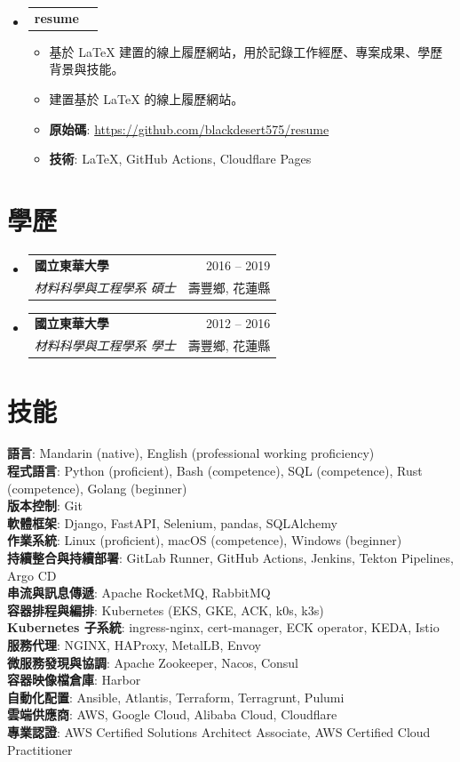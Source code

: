 \documentclass[letterpaper,11pt]{article}
\makeatletter
\newcommand{\resumeItem}[1]{
  \item\small{
    {#1 \vspace{-1pt}}
  }
}
\newcommand{\resumeSubheading}[4]{
  \vspace{-1pt}\item
    \begin{tabular*}{\textwidth}[t]{l@{\extracolsep{\fill}}r}
      \textbf{#1} & {\color{dark-grey}\small #2}\vspace{1pt}\\
      \textit{#3} & {\color{dark-grey} \small #4}\\
    \end{tabular*}\vspace{-4pt}
}
\newcommand{\resumeProjectHeading}[2]{
    \item
    \begin{tabular*}{\textwidth}{l@{\extracolsep{\fill}}r}
      #1 & {\color{dark-grey} #2} \\
    \end{tabular*}\vspace{-4pt}
}
\newcommand{\resumeSubHeadingListStart}{\begin{itemize}[leftmargin=0in, label={}]}
\newcommand{\resumeSubHeadingListEnd}{\end{itemize}}
\newcommand{\resumeItemListStart}{\begin{itemize}}
\newcommand{\resumeItemListEnd}{\end{itemize}\vspace{0pt}}
\makeatother
\begin{document}
\resumeSubHeadingListStart
\resumeProjectHeading
  {\textbf{resume}}{}
  \resumeItemListStart
    \resumeItem{基於 LaTeX 建置的線上履歷網站，用於記錄工作經歷、專案成果、學歷背景與技能。}
    \resumeItem{建置基於 LaTeX 的線上履歷網站。}
    \resumeItem{\textbf{原始碼}: \href{https://github.com/blackdesert575/resume}{https://github.com/blackdesert575/resume}}
    \resumeItem{\textbf{技術}: LaTeX, GitHub Actions, Cloudflare Pages}
  \resumeItemListEnd
\resumeSubHeadingListEnd

\section{學歷}
\resumeSubHeadingListStart
\resumeSubheading
  {國立東華大學}{2016 -- 2019}
  {材料科學與工程學系 碩士}{壽豐鄉, 花蓮縣}

\resumeSubheading
  {國立東華大學}{2012 -- 2016}
  {材料科學與工程學系 學士}{壽豐鄉, 花蓮縣}
\resumeSubHeadingListEnd

\section{技能}
 \begin{itemize}[leftmargin=0in, label={}]
    \small{\item{
     \textbf{語言}{: Mandarin (native), English (professional working proficiency)} \\
     \textbf{程式語言}{: Python (proficient), Bash (competence), SQL (competence), Rust (competence), Golang (beginner)} \\
     \textbf{版本控制}{: Git} \\
     \textbf{軟體框架}{: Django, FastAPI, Selenium, pandas, SQLAlchemy} \\
     \textbf{作業系統}{: Linux (proficient), macOS (competence), Windows (beginner)} \\
     \textbf{持續整合與持續部署}{: GitLab Runner, GitHub Actions, Jenkins, Tekton Pipelines, Argo CD} \\
     \textbf{串流與訊息傳遞}{: Apache RocketMQ, RabbitMQ} \\
     \textbf{容器排程與編排}{: Kubernetes (EKS, GKE, ACK, k0s, k3s)} \\
     \textbf{Kubernetes 子系統}{: ingress-nginx, cert-manager, ECK operator, KEDA, Istio} \\
     \textbf{服務代理}{: NGINX, HAProxy, MetalLB, Envoy} \\
     \textbf{微服務發現與協調}{: Apache Zookeeper, Nacos, Consul} \\
     \textbf{容器映像檔倉庫}{: Harbor} \\
     \textbf{自動化配置}{: Ansible, Atlantis, Terraform, Terragrunt, Pulumi} \\
     \textbf{雲端供應商}{: AWS, Google Cloud, Alibaba Cloud, Cloudflare} \\
     \textbf{專業認證}{: AWS Certified Solutions Architect Associate, AWS Certified Cloud Practitioner}
    }}
 \end{itemize}
\end{document}
